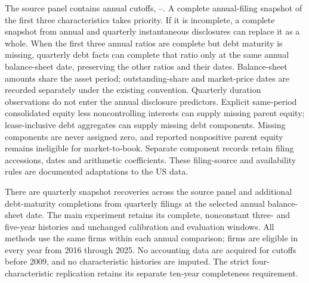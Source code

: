 \documentclass[11pt]{article}
\begin{document}
The source panel contains \SourceYears{} annual cutoffs,
\FirstSourceYear--\LastSourceYear. A complete annual-filing snapshot
of the first
three characteristics takes priority. If it is incomplete, a complete snapshot
from annual and quarterly instantaneous disclosures can replace it as a whole.
When the first three annual ratios are complete but debt maturity is missing,
quarterly debt facts can complete that ratio only at the same annual
balance-sheet date, preserving the other ratios and their dates.
Balance-sheet amounts share the asset period; outstanding-share and market-price
dates are recorded separately under the existing convention. Quarterly
duration observations do not enter the annual disclosure predictors. Explicit
same-period consolidated equity less noncontrolling interests can supply missing
parent equity; lease-inclusive debt aggregates can supply missing debt
components. Missing components are never assigned zero, and reported
nonpositive parent equity remains ineligible for market-to-book. Separate
component records retain filing accessions, dates and arithmetic coefficients.
These filing-source and availability rules are documented adaptations to the
US data.

\begin{table}[htbp]
  \centering\small
  
  \caption{Observed characteristic coverage among the 1,000 issuers at each
    year-end cutoff. Quarterly recoveries count complete snapshots supplied by
    the fallback policy. These counts precede history and return eligibility
    requirements. The final source snapshot supports coverage reporting;
  the 2025 return analysis uses information through 2024.}
\end{table}

There are \RecoveredSnapshots{} quarterly snapshot recoveries across the source
panel and \RecoveredDebtSnapshots{} additional debt-maturity completions from
quarterly filings at the selected annual balance-sheet date. The main experiment
retains its complete, nonconstant three- and
five-year histories and unchanged calibration and evaluation windows. All
methods use the same firms within each annual comparison;
\FixedCohortFirms{} firms are eligible in every year from 2016 through 2025.
No accounting data are acquired for cutoffs before 2009, and no characteristic
histories are imputed. The strict four-characteristic replication
retains its separate
ten-year completeness requirement.

\begin{table}[htbp]
  \centering\small
  
  \caption{Annual samples and information sets. Outcomes in
    2016--2019 fit spatial
    coefficients; 2020--2025 evaluate forecasts. Outside reference firms define
  the historical exposure target.}
\end{table}
\end{document}

